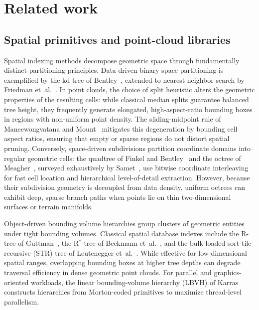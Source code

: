 \section{Related work}\label{sec:related}

\subsection{Spatial primitives and point-cloud libraries}

Spatial indexing methods decompose geometric space through fundamentally distinct partitioning principles. Data-driven binary space partitioning is exemplified by the kd-tree of Bentley~\cite{bentley1975kdtree}, extended to nearest-neighbor search by Friedman et~al.~\cite{friedman1977kdtree}. In point clouds, the choice of split heuristic alters the geometric properties of the resulting cells: while classical median splits guarantee balanced tree height, they frequently generate elongated, high-aspect-ratio bounding boxes in regions with non-uniform point density. The sliding-midpoint rule of Maneewongvatana and Mount~\cite{maneewongvatana1999sliding} mitigates this degeneration by bounding cell aspect ratios, ensuring that empty or sparse regions do not distort spatial pruning. Conversely, space-driven subdivisions partition coordinate domains into regular geometric cells: the quadtree of Finkel and Bentley~\cite{finkel1974quadtrees} and the octree of Meagher~\cite{meagher1980octree}, surveyed exhaustively by Samet~\cite{samet2006foundations}, use bitwise coordinate interleaving for fast cell location and hierarchical level-of-detail extraction. However, because their subdivision geometry is decoupled from data density, uniform octrees can exhibit deep, sparse branch paths when points lie on thin two-dimensional surfaces or terrain manifolds.

Object-driven bounding volume hierarchies group clusters of geometric entities under tight bounding volumes. Classical spatial database indexes include the R-tree of Guttman~\cite{guttman1984rtree}, the R$^*$-tree of Beckmann et~al.~\cite{beckmann1990rstar}, and the bulk-loaded sort-tile-recursive (STR) tree of Leutenegger et~al.~\cite{leutenegger1997str}. While effective for low-dimensional spatial ranges, overlapping bounding boxes at higher tree depths can degrade traversal efficiency in dense geometric point clouds. For parallel and graphics-oriented workloads, the linear bounding-volume hierarchy (LBVH) of Karras~\cite{karras2012lbvh} constructs hierarchies from Morton-coded primitives to maximize thread-level parallelism.

